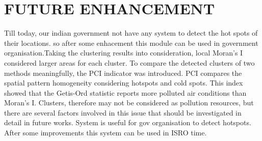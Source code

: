 \documentclass[12pt]{report}	%
\begin{document}
\newpage

\chapter{FUTURE ENHANCEMENT}
Till today, our indian government not have any system to detect the hot spots of their locations. so after some enhacement this module can be used in government organisation.Taking the clustering results into consideration, local Moran’s I considered larger
areas for each cluster. To compare the detected clusters of two methods meaningfully, the PCI indicator
was introduced. PCI compares the spatial pattern homogeneity considering hotspots and cold spots.
This index showed that the Getis-Ord statistic reports more polluted air conditions than Moran’s I.
Clusters, therefore may not be considered as pollution resources, but there are several factors involved
in this issue that should be investigated in detail in future works. System is useful for gov organisation to detect hotspots.
After some improvements this system can be used in ISRO
time. 
\newpage
\end{document}
